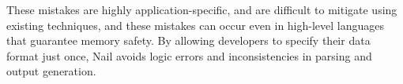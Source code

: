 These mistakes are highly application-specific, and
are difficult to mitigate using existing techniques, and these mistakes
can occur even in high-level languages that guarantee memory safety. By
allowing developers to specify their data format just once, Nail avoids
logic errors and inconsistencies in parsing and output generation.







